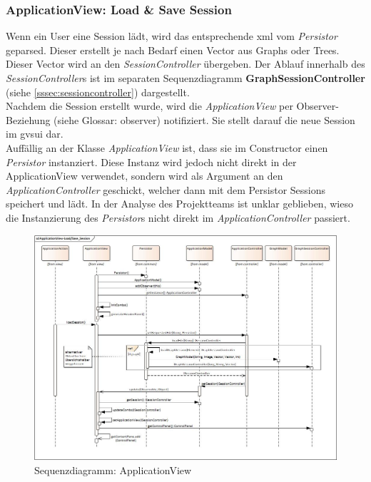 \documentclass[11pt,a4paper,english,oneside]{book}
\numberwithin{equation}{chapter}
\begin{document}
	\subsubsection{ApplicationView: Load \& Save Session} \label{sssec:appView}
	Wenn ein User eine Session lädt, wird das entsprechende \gls{xml} vom \textit{Persistor} geparsed. Dieser erstellt je nach Bedarf einen Vector aus Graphs oder Trees. Dieser Vector wird an den \textit{SessionController} übergeben. Der Ablauf innerhalb des \textit{SessionController}s ist im separaten Sequenzdiagramm \textbf{GraphSessionController} (siehe \ref{sssec:sessioncontroller}) dargestellt. \\
	Nachdem die Session erstellt wurde, wird die \textit{ApplicationView} per Observer-Beziehung (siehe Glossar: \gls{observer}) notifiziert. Sie stellt darauf die neue Session im \gls{gvsui} dar.\\
	Auffällig an der Klasse \textit{ApplicationView} ist, dass sie im Constructor einen \textit{Persistor} instanziert. Diese Instanz wird jedoch nicht direkt in der ApplicationView verwendet, sondern wird als Argument an den \textit{ApplicationController} geschickt, welcher dann mit dem Persistor Sessions speichert und lädt. In der Analyse des Projektteams ist unklar geblieben, wieso die Instanzierung des \textit{Persistor}s nicht direkt im \textit{ApplicationController} passiert.
	\begin{figure}[h!]
		\centering
		\includegraphics[width=\linewidth]{assets/images/application_view}
		\caption{Sequenzdiagramm: ApplicationView}
		\label{fig:sd-applicationview}
	\end{figure}
\end{document}
